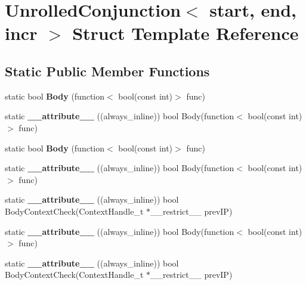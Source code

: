 \hypertarget{structUnrolledConjunction}{\section{Unrolled\-Conjunction$<$ start, end, incr $>$ Struct Template Reference}
\label{structUnrolledConjunction}
}
\subsection*{Static Public Member Functions}
\begin{DoxyCompactItemize}
\item 
\hypertarget{structUnrolledConjunction_a7b07b55bfab1c0952a73bd2a52b95dc2}{static bool {\bfseries Body} (function$<$ bool(const int)$>$ func)}\label{structUnrolledConjunction_a7b07b55bfab1c0952a73bd2a52b95dc2}

\item 
\hypertarget{structUnrolledConjunction_abff16c7ce6d8c3a9ad452bebd044548e}{static {\bfseries \-\_\-\-\_\-attribute\-\_\-\-\_\-} ((always\-\_\-inline)) bool Body(function$<$ bool(const int)$>$ func)}\label{structUnrolledConjunction_abff16c7ce6d8c3a9ad452bebd044548e}

\item 
\hypertarget{structUnrolledConjunction_a7b07b55bfab1c0952a73bd2a52b95dc2}{static bool {\bfseries Body} (function$<$ bool(const int)$>$ func)}\label{structUnrolledConjunction_a7b07b55bfab1c0952a73bd2a52b95dc2}

\item 
\hypertarget{structUnrolledConjunction_abff16c7ce6d8c3a9ad452bebd044548e}{static {\bfseries \-\_\-\-\_\-attribute\-\_\-\-\_\-} ((always\-\_\-inline)) bool Body(function$<$ bool(const int)$>$ func)}\label{structUnrolledConjunction_abff16c7ce6d8c3a9ad452bebd044548e}

\item 
\hypertarget{structUnrolledConjunction_a5969f5fbb84996e78689b1d8c9ba7693}{static {\bfseries \-\_\-\-\_\-attribute\-\_\-\-\_\-} ((always\-\_\-inline)) bool Body\-Context\-Check(Context\-Handle\-\_\-t $\ast$\-\_\-\-\_\-restrict\-\_\-\-\_\- prev\-I\-P)}\label{structUnrolledConjunction_a5969f5fbb84996e78689b1d8c9ba7693}

\item 
\hypertarget{structUnrolledConjunction_abff16c7ce6d8c3a9ad452bebd044548e}{static {\bfseries \-\_\-\-\_\-attribute\-\_\-\-\_\-} ((always\-\_\-inline)) bool Body(function$<$ bool(const int)$>$ func)}\label{structUnrolledConjunction_abff16c7ce6d8c3a9ad452bebd044548e}

\item 
\hypertarget{structUnrolledConjunction_a5969f5fbb84996e78689b1d8c9ba7693}{static {\bfseries \-\_\-\-\_\-attribute\-\_\-\-\_\-} ((always\-\_\-inline)) bool Body\-Context\-Check(Context\-Handle\-\_\-t $\ast$\-\_\-\-\_\-restrict\-\_\-\-\_\- prev\-I\-P)}\label{structUnrolledConjunction_a5969f5fbb84996e78689b1d8c9ba7693}

\end{DoxyCompactItemize}


